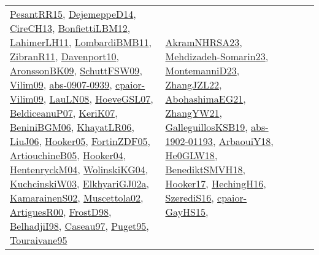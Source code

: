 {\begin{longtable}{lp{3cm}>{\raggedright}p{6cm}>{\raggedright}p{6cm}p{8cm}}
\href{papers/PesantRR15.pdf}{PesantRR15}\cite{PesantRR15}, \href{papers/DejemeppeD14.pdf}{DejemeppeD14}\cite{DejemeppeD14}, \href{papers/CireCH13.pdf}{CireCH13}\cite{CireCH13}, \href{papers/BonfiettiLBM12.pdf}{BonfiettiLBM12}\cite{BonfiettiLBM12}, \href{papers/LahimerLH11.pdf}{LahimerLH11}\cite{LahimerLH11}, \href{papers/LombardiBMB11.pdf}{LombardiBMB11}\cite{LombardiBMB11}, \href{papers/ZibranR11.pdf}{ZibranR11}\cite{ZibranR11}, \href{papers/Davenport10.pdf}{Davenport10}\cite{Davenport10}, \href{papers/AronssonBK09.pdf}{AronssonBK09}\cite{AronssonBK09}, \href{papers/SchuttFSW09.pdf}{SchuttFSW09}\cite{SchuttFSW09}, \href{papers/Vilim09.pdf}{Vilim09}\cite{Vilim09}, \href{articles/abs-0907-0939.pdf}{abs-0907-0939}\cite{abs-0907-0939}, \href{papers/cpaior-Vilim09.pdf}{cpaior-Vilim09}\cite{cpaior-Vilim09}, \href{papers/LauLN08.pdf}{LauLN08}\cite{LauLN08}, \href{papers/HoeveGSL07.pdf}{HoeveGSL07}\cite{HoeveGSL07}, \href{papers/BeldiceanuP07.pdf}{BeldiceanuP07}\cite{BeldiceanuP07}, \href{papers/KeriK07.pdf}{KeriK07}\cite{KeriK07}, \href{papers/BeniniBGM06.pdf}{BeniniBGM06}\cite{BeniniBGM06}, \href{articles/KhayatLR06.pdf}{KhayatLR06}\cite{KhayatLR06}, \href{papers/LiuJ06.pdf}{LiuJ06}\cite{LiuJ06}, \href{articles/Hooker05.pdf}{Hooker05}\cite{Hooker05}, \href{papers/FortinZDF05.pdf}{FortinZDF05}\cite{FortinZDF05}, \href{papers/ArtiouchineB05.pdf}{ArtiouchineB05}\cite{ArtiouchineB05}, \href{papers/Hooker04.pdf}{Hooker04}\cite{Hooker04}, \href{papers/HentenryckM04.pdf}{HentenryckM04}\cite{HentenryckM04}, \href{papers/WolinskiKG04.pdf}{WolinskiKG04}\cite{WolinskiKG04}, \href{articles/KuchcinskiW03.pdf}{KuchcinskiW03}\cite{KuchcinskiW03}, \href{papers/ElkhyariGJ02a.pdf}{ElkhyariGJ02a}\cite{ElkhyariGJ02a}, \href{papers/KamarainenS02.pdf}{KamarainenS02}\cite{KamarainenS02}, \href{papers/Muscettola02.pdf}{Muscettola02}\cite{Muscettola02}, \href{articles/ArtiguesR00.pdf}{ArtiguesR00}\cite{ArtiguesR00}, \href{papers/FrostD98.pdf}{FrostD98}\cite{FrostD98}, \href{articles/BelhadjiI98.pdf}{BelhadjiI98}\cite{BelhadjiI98}, \href{papers/Caseau97.pdf}{Caseau97}\cite{Caseau97}, \href{papers/Puget95.pdf}{Puget95}\cite{Puget95}, \href{papers/Touraivane95.pdf}{Touraivane95}\cite{Touraivane95} & \href{articles/AkramNHRSA23.pdf}{AkramNHRSA23}\cite{AkramNHRSA23}, \href{papers/Mehdizadeh-Somarin23.pdf}{Mehdizadeh-Somarin23}\cite{Mehdizadeh-Somarin23}, \href{articles/MontemanniD23.pdf}{MontemanniD23}\cite{MontemanniD23}, \href{papers/ZhangJZL22.pdf}{ZhangJZL22}\cite{ZhangJZL22}, \href{articles/AbohashimaEG21.pdf}{AbohashimaEG21}\cite{AbohashimaEG21}, \href{articles/ZhangYW21.pdf}{ZhangYW21}\cite{ZhangYW21}, \href{papers/GalleguillosKSB19.pdf}{GalleguillosKSB19}\cite{GalleguillosKSB19}, \href{articles/abs-1902-01193.pdf}{abs-1902-01193}\cite{abs-1902-01193}, \href{papers/ArbaouiY18.pdf}{ArbaouiY18}\cite{ArbaouiY18}, \href{papers/He0GLW18.pdf}{He0GLW18}\cite{He0GLW18}, \href{papers/BenediktSMVH18.pdf}{BenediktSMVH18}\cite{BenediktSMVH18}, \href{papers/Hooker17.pdf}{Hooker17}\cite{Hooker17}, \href{papers/HechingH16.pdf}{HechingH16}\cite{HechingH16}, \href{papers/SzerediS16.pdf}{SzerediS16}\cite{SzerediS16}, \href{papers/cpaior-GayHS15.pdf}{cpaior-GayHS15}\cite{cpaior-GayHS15}, 
\end{longtable}}
